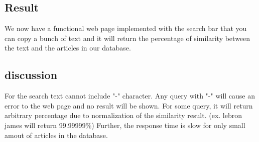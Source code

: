 \subsection{Result}
We now have a functional web page implemented with the  search bar that you can copy a bunch of text and it will return the percentage of similarity between the text and the articles in our database. 

\subsection{discussion}
For the search text cannot include "-" character. Any query with "-" will cause an error to the web page and no result will be shown. For some query, it will return arbitrary percentage due to normalization of the similarity result. (ex. lebron james will return 99.99999\%)
Further, the response time is slow for only small amout of articles in the database.